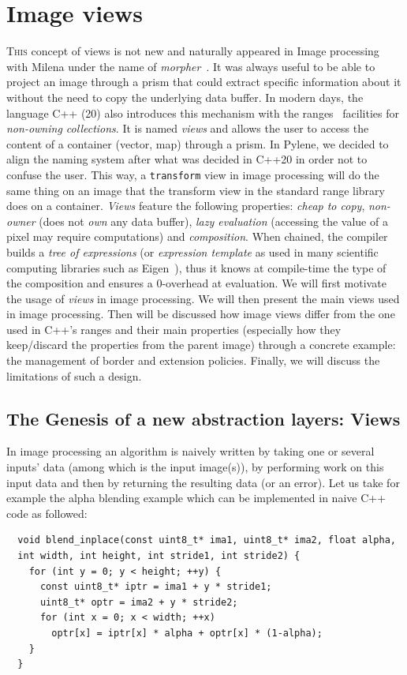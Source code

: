 \chapter{Image views}
\label{chap:image_views}

\lettrine[lines=2]{T}{his} concept of views is not new and naturally appeared in Image processing with Milena under the
name of \emph{morpher}~\parencite{levillain.2009.ismm, geraud.2012.hdr}. It was always useful to be able to project an
image through a prism that could extract specific information about it without the need to copy the underlying data
buffer. In modern days, the language C++ (20) also introduces this mechanism with the
ranges~\parencite{niebler.2014.ranges} facilities for \emph{non-owning collections}. It is named \emph{views} and allows
the user to access the content of a container (vector, map) through a prism. In Pylene, we decided to align the naming
system after what was decided in C++20 in order not to confuse the user. This way, a \texttt{transform} view in image
processing will do the same thing on an image that the transform view in the standard range library does on a container.
\emph{Views} feature the following properties: \emph{cheap to copy}, \emph{non-owner} (does not \emph{own} any data
buffer), \emph{lazy evaluation} (accessing the value of a pixel may require computations) and \emph{composition}. When
chained, the compiler builds a \emph{tree of expressions} (or \emph{expression template} as used in many scientific
computing libraries such as Eigen~\parencite{guennebaud.2010.eigen}), thus it knows at compile-time the type of the
composition and ensures a 0-overhead at evaluation. We will first motivate the usage of \emph{views} in image
processing. We will then present the main views used in image processing. Then will be discussed how image views differ
from the one used in C++'s ranges and their main properties (especially how they keep/discard the properties from the
parent image) through a concrete example: the management of border and extension policies. Finally, we will discuss the
limitations of such a design.

\section{The Genesis of a new abstraction layers: Views}
\label{sec:genesis_of_views}

In image processing an algorithm is naively written by taking one or several inputs' data (among which is the input
image(s)),  by performing work on this input data and then by returning the resulting data (or an error). Let us take
for example the alpha blending example which can be implemented in naive C++ code as followed:
\begin{verbatim}
  void blend_inplace(const uint8_t* ima1, uint8_t* ima2, float alpha,
  int width, int height, int stride1, int stride2) {
    for (int y = 0; y < height; ++y) {
      const uint8_t* iptr = ima1 + y * stride1;
      uint8_t* optr = ima2 + y * stride2;
      for (int x = 0; x < width; ++x)
        optr[x] = iptr[x] * alpha + optr[x] * (1-alpha);
    }
  }
\end{verbatim}

